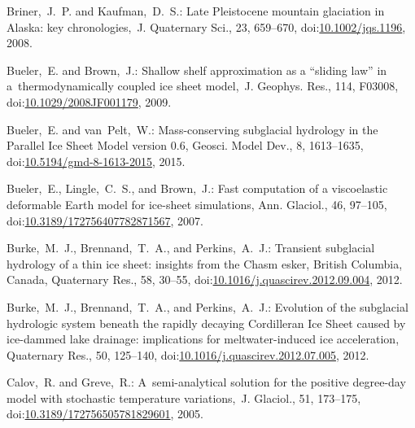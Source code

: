 \documentclass[tc, manuscript]{copernicus}
\begin{document}
\begin{thebibliography}{114}
Briner,~J.~P. and Kaufman,~D.~S.: Late Pleistocene mountain glaciation in Alaska: key chronologies,~J. Quaternary Sci., 23, 659--670,
doi:\href{http://dx.doi.org/10.1002/jqs.1196}{10.1002/jqs.1196}, 2008.


Bueler,~E. and Brown,~J.: Shallow shelf approximation as a ``sliding law'' in a~thermodynamically coupled ice sheet model,~J. Geophys. Res., 114, F03008,
doi:\href{http://dx.doi.org/10.1029/2008JF001179}{10.1029/2008JF001179}, 2009.


 Bueler,~E. and van~Pelt,~W.: Mass-conserving subglacial hydrology in the Parallel Ice Sheet Model version 0.6, Geosci. Model Dev., 8, 1613--1635,
doi:\href{http://dx.doi.org/10.5194/gmd-8-1613-2015}{10.5194/gmd-8-1613-2015}, 2015.



Bueler,~E., Lingle,~C.~S., and Brown,~J.: Fast computation of a viscoelastic deformable Earth model for ice-sheet simulations, Ann. Glaciol., 46, 97--105,
doi:\href{http://dx.doi.org/10.3189/172756407782871567}{10.3189/172756407782871567}, 2007.


Burke,~M.~J., Brennand,~T.~A., and Perkins,~A.~J.: Transient subglacial hydrology of a thin ice sheet: insights from the Chasm esker, British Columbia, Canada, Quaternary Res., 58, 30--55,
doi:\href{http://dx.doi.org/10.1016/j.quascirev.2012.09.004}{10.1016/j.quascirev.2012.09.004}, 2012{}.


Burke,~M.~J., Brennand,~T.~A., and Perkins,~A.~J.: Evolution of the subglacial hydrologic system beneath the rapidly decaying Cordilleran Ice Sheet caused by ice-dammed lake drainage: implications for meltwater-induced ice acceleration, Quaternary Res., 50, 125--140,
doi:\href{http://dx.doi.org/10.1016/j.quascirev.2012.07.005}{10.1016/j.quascirev.2012.07.005}, 2012{}.


Calov,~R. and Greve,~R.: A~semi-analytical solution for the positive degree-day model with stochastic temperature variations,~J. Glaciol., 51, 173--175,
doi:\href{http://dx.doi.org/10.3189/172756505781829601}{10.3189/172756505781829601}, 2005.



\end{thebibliography}
\end{document}
